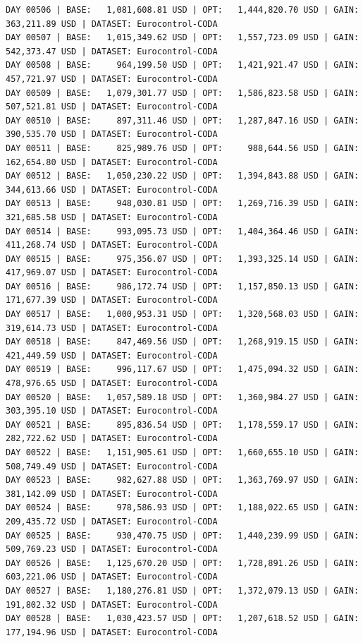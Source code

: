 \documentclass[11pt,a4paper]{article}
\begin{document}
\begin{verbatim}
DAY 00506 | BASE:   1,081,608.81 USD | OPT:   1,444,820.70 USD | GAIN: 363,211.89 USD | DATASET: Eurocontrol-CODA
DAY 00507 | BASE:   1,015,349.62 USD | OPT:   1,557,723.09 USD | GAIN: 542,373.47 USD | DATASET: Eurocontrol-CODA
DAY 00508 | BASE:     964,199.50 USD | OPT:   1,421,921.47 USD | GAIN: 457,721.97 USD | DATASET: Eurocontrol-CODA
DAY 00509 | BASE:   1,079,301.77 USD | OPT:   1,586,823.58 USD | GAIN: 507,521.81 USD | DATASET: Eurocontrol-CODA
DAY 00510 | BASE:     897,311.46 USD | OPT:   1,287,847.16 USD | GAIN: 390,535.70 USD | DATASET: Eurocontrol-CODA
DAY 00511 | BASE:     825,989.76 USD | OPT:     988,644.56 USD | GAIN: 162,654.80 USD | DATASET: Eurocontrol-CODA
DAY 00512 | BASE:   1,050,230.22 USD | OPT:   1,394,843.88 USD | GAIN: 344,613.66 USD | DATASET: Eurocontrol-CODA
DAY 00513 | BASE:     948,030.81 USD | OPT:   1,269,716.39 USD | GAIN: 321,685.58 USD | DATASET: Eurocontrol-CODA
DAY 00514 | BASE:     993,095.73 USD | OPT:   1,404,364.46 USD | GAIN: 411,268.74 USD | DATASET: Eurocontrol-CODA
DAY 00515 | BASE:     975,356.07 USD | OPT:   1,393,325.14 USD | GAIN: 417,969.07 USD | DATASET: Eurocontrol-CODA
DAY 00516 | BASE:     986,172.74 USD | OPT:   1,157,850.13 USD | GAIN: 171,677.39 USD | DATASET: Eurocontrol-CODA
DAY 00517 | BASE:   1,000,953.31 USD | OPT:   1,320,568.03 USD | GAIN: 319,614.73 USD | DATASET: Eurocontrol-CODA
DAY 00518 | BASE:     847,469.56 USD | OPT:   1,268,919.15 USD | GAIN: 421,449.59 USD | DATASET: Eurocontrol-CODA
DAY 00519 | BASE:     996,117.67 USD | OPT:   1,475,094.32 USD | GAIN: 478,976.65 USD | DATASET: Eurocontrol-CODA
DAY 00520 | BASE:   1,057,589.18 USD | OPT:   1,360,984.27 USD | GAIN: 303,395.10 USD | DATASET: Eurocontrol-CODA
DAY 00521 | BASE:     895,836.54 USD | OPT:   1,178,559.17 USD | GAIN: 282,722.62 USD | DATASET: Eurocontrol-CODA
DAY 00522 | BASE:   1,151,905.61 USD | OPT:   1,660,655.10 USD | GAIN: 508,749.49 USD | DATASET: Eurocontrol-CODA
DAY 00523 | BASE:     982,627.88 USD | OPT:   1,363,769.97 USD | GAIN: 381,142.09 USD | DATASET: Eurocontrol-CODA
DAY 00524 | BASE:     978,586.93 USD | OPT:   1,188,022.65 USD | GAIN: 209,435.72 USD | DATASET: Eurocontrol-CODA
DAY 00525 | BASE:     930,470.75 USD | OPT:   1,440,239.99 USD | GAIN: 509,769.23 USD | DATASET: Eurocontrol-CODA
DAY 00526 | BASE:   1,125,670.20 USD | OPT:   1,728,891.26 USD | GAIN: 603,221.06 USD | DATASET: Eurocontrol-CODA
DAY 00527 | BASE:   1,180,276.81 USD | OPT:   1,372,079.13 USD | GAIN: 191,802.32 USD | DATASET: Eurocontrol-CODA
DAY 00528 | BASE:   1,030,423.57 USD | OPT:   1,207,618.52 USD | GAIN: 177,194.96 USD | DATASET: Eurocontrol-CODA

\end{verbatim}
\end{document}
